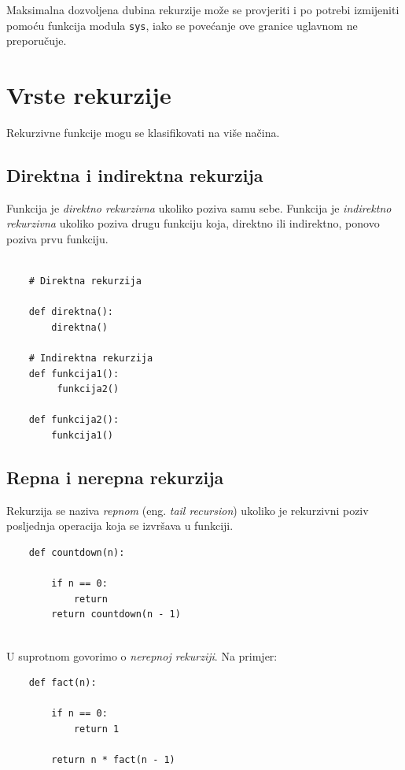 Maksimalna dozvoljena dubina rekurzije može se provjeriti i po potrebi izmijeniti pomoću funkcija modula \texttt{sys}, iako se povećanje ove granice uglavnom ne preporučuje.

\section{Vrste rekurzije}

Rekurzivne funkcije mogu se klasifikovati na više načina.

\subsection*{Direktna i indirektna rekurzija}

Funkcija je \textit{direktno rekurzivna} ukoliko poziva samu sebe. Funkcija je \textit{indirektno rekurzivna} ukoliko poziva drugu funkciju koja, direktno ili indirektno, ponovo poziva prvu funkciju.

\begin{verbatim}
	
	# Direktna rekurzija
	
	def direktna():
	    direktna()
	
	# Indirektna rekurzija
	def funkcija1():
	     funkcija2()
	
	def funkcija2():
	    funkcija1()
\end{verbatim}

\subsection*{Repna i nerepna rekurzija}

Rekurzija se naziva \textit{repnom} (eng. \textit{tail recursion}) ukoliko je rekurzivni poziv posljednja operacija koja se izvršava u funkciji.

\begin{verbatim}
	def countdown(n):
	
	    if n == 0:
	        return
	    return countdown(n - 1)
	
\end{verbatim}

U suprotnom govorimo o \textit{nerepnoj rekurziji}. Na primjer:

\begin{verbatim}
	def fact(n):
	
	    if n == 0:
	        return 1
	
	    return n * fact(n - 1)
	
\end{verbatim}

